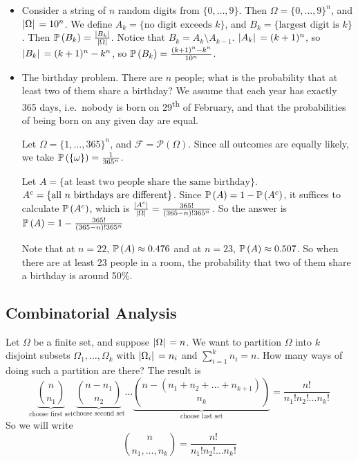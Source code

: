 \begin{itemize}
	\item Consider a string of \(n\) random digits from \(\{0, \dots, 9\}\).
	      Then \(\Omega = \{ 0, \dots, 9 \}^n\), and \(\abs*{\Omega} = 10^n\).
	      We define \(A_k = \{ \text{no digit exceeds } k \}\), and \(B_k = \{ \text{largest digit is } k \}\).
	      Then \(\mathbb{P}\left({B_k}\right) = \frac{\abs*{B_k}}{\abs*{\Omega}}\).
	      Notice that \(B_k = A_k \setminus A_{k-1}\).
	      \(\abs*{A_k} = (k+1)^n\), so \(\abs*{B_k} = (k+1)^n - k^n\), so \(\mathbb{P}\left({B_k}\right) = \frac{(k+1)^n - k^n}{10^n}\).
	      
	\item The birthday problem.
	      There are \(n\) people; what is the probability that at least two of them share a birthday? We assume that each year has exactly 365 days, i.e.\ nobody is born on 29\textsuperscript{th} of February, and that the probabilities of being born on any given day are equal.
	      
	      Let \(\Omega = \{1, \dots, 365\}^n\), and \(\mathcal F = \mathcal P(\Omega)\).
	      Since all outcomes are equally likely, we take \(\mathbb{P}\left({\{\omega\}}\right) = \frac{1}{365^n}\).
	      
	      Let \(A = \{ \text{at least two people share the same birthday} \}\).
	      \({A}^c = \{ \text{all } n \text{ birthdays are different} \}\).
	      Since \(\mathbb{P}\left({A}\right) = 1 - \mathbb{P}\left({{A}^c}\right)\), it suffices to calculate \(\mathbb{P}\left({{A}^c}\right)\), which is \(\frac{\abs*{{A}^c}}{\abs*{\Omega}} = \frac{365!}{(365 - n)!365^n}\).
	      So the answer is \(\mathbb{P}\left({A}\right) = 1 - \frac{365!}{(365 - n)!365^n}\)
	      
	      Note that at \(n=22\), \(\mathbb{P}\left({A}\right) \approx 0.476\) and at \(n=23\), \(\mathbb{P}\left({A}\right) \approx 0.507\).
	      So when there are at least 23 people in a room, the probability that two of them share a birthday is around 50\%.
\end{itemize}

\subsection{Combinatorial Analysis}
Let \(\Omega\) be a finite set, and suppose \(\abs*{\Omega} = n\).
We want to partition \(\Omega\) into \(k\) disjoint subsets \(\Omega_1, \dots, \Omega_k\) with \(\abs*{\Omega_i} = n_i\) and \(\sum_{i=1}^k n_i = n\).
How many ways of doing such a partition are there? The result is
\[
	\underbrace{\binom{n}{n_1}}_{\text{choose first set}}\underbrace{\binom{n-n_1}{n_2}}_{\text{choose second set}}\dots\underbrace{\binom{n-(n_1 + n_2 + \dots + n_{k+1})}{n_k}}_{\text{choose last set}} = \frac{n!}{n_1!n_2!\dots n_k!}
\]
So we will write
\[
	\binom{n}{n_1, \dots, n_k} = \frac{n!}{n_1!n_2!\dots n_k!}
\]

